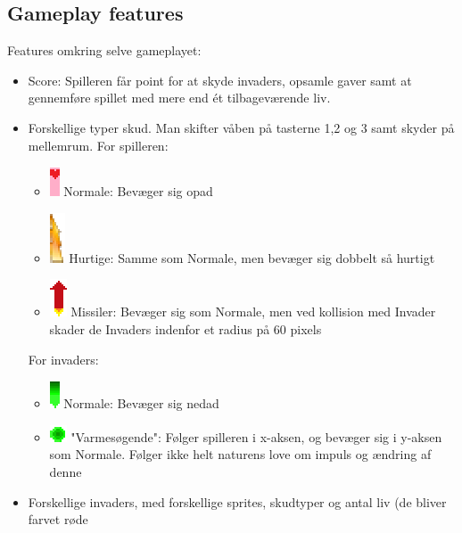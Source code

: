 \documentclass[titlepage,danish]{article}
\begin{document}
\subsection{Gameplay features}Features omkring selve gameplayet:
\begin{itemize}
\item Score: Spilleren får point for at skyde invaders, opsamle gaver samt at gennemføre spillet med
  mere end ét tilbageværende liv.
\item Forskellige typer skud. Man skifter våben på tasterne 1,2 og 3 samt skyder på mellemrum. For
  spilleren:
  \begin{itemize}
  \item \includegraphics[scale=0.60]{bullet.eps} Normale: Bevæger sig opad
  \item \includegraphics[scale=0.60]{fastBullet.eps} Hurtige: Samme som Normale, men bevæger sig
    dobbelt så hurtigt
  \item \includegraphics[scale=0.60]{missile.eps} Missiler: Bevæger sig som Normale, men ved
    kollision med Invader skader de Invaders indenfor et radius på 60 pixels
  \end{itemize} For invaders:
  \begin{itemize}
  \item \includegraphics[scale=0.60]{bulletInvader.eps} Normale: Bevæger sig nedad
  \item \includegraphics[scale=0.60]{bulletInvaderHoming.eps} "Varmesøgende": Følger spilleren i
    x-aksen, og bevæger sig i y-aksen som Normale. Følger ikke helt naturens love om impuls og
    ændring af denne
  \end{itemize}
\item Forskellige invaders, med forskellige sprites, skudtyper og antal liv (de bliver farvet røde

\end{itemize}
\end{document}
